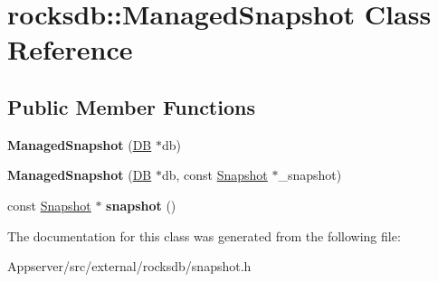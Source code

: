 \hypertarget{classrocksdb_1_1ManagedSnapshot}{}\section{rocksdb\+:\+:Managed\+Snapshot Class Reference}
\label{classrocksdb_1_1ManagedSnapshot}
\subsection*{Public Member Functions}
\begin{DoxyCompactItemize}
\item 
{\bfseries Managed\+Snapshot} (\hyperlink{classrocksdb_1_1DB}{DB} $\ast$db)\hypertarget{classrocksdb_1_1ManagedSnapshot_ad1906cef031ba6c14d6d46bcf0a81983}{}\label{classrocksdb_1_1ManagedSnapshot_ad1906cef031ba6c14d6d46bcf0a81983}

\item 
{\bfseries Managed\+Snapshot} (\hyperlink{classrocksdb_1_1DB}{DB} $\ast$db, const \hyperlink{classrocksdb_1_1Snapshot}{Snapshot} $\ast$\+\_\+snapshot)\hypertarget{classrocksdb_1_1ManagedSnapshot_a32c15ed8e364116f9390567f0395509e}{}\label{classrocksdb_1_1ManagedSnapshot_a32c15ed8e364116f9390567f0395509e}

\item 
const \hyperlink{classrocksdb_1_1Snapshot}{Snapshot} $\ast$ {\bfseries snapshot} ()\hypertarget{classrocksdb_1_1ManagedSnapshot_ab82cf7752fb1fe14bfef62d03b2f4a2c}{}\label{classrocksdb_1_1ManagedSnapshot_ab82cf7752fb1fe14bfef62d03b2f4a2c}

\end{DoxyCompactItemize}


The documentation for this class was generated from the following file\+:\begin{DoxyCompactItemize}
\item 
Appserver/src/external/rocksdb/snapshot.\+h\end{DoxyCompactItemize}
